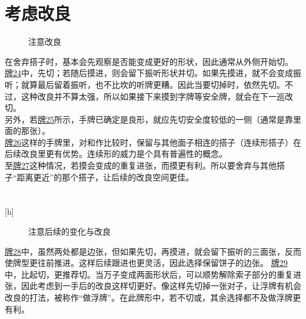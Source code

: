 \section{考虑改良}
\begin{figure}
    \caption{注意改良}
    \label{lec6:pai24-27}
    \par\bigskip
    \par\bigskip
    \par\bigskip
\end{figure}
在舍弃搭子时，基本会先观察是否能变成更好的形状，因此通常从外侧开始切。
\hyperref[lec6:pai24-26]{牌24}中，先切；若随后摸进，则会留下振听形状并切。如果先摸进，就不会变成振听；就算最后留着振听，也不比坎的听牌更糟。因此当要切掉时，依然先切。不过，这种改良并不算太强，所以如果接下来摸到字牌等安全牌，就会在下一巡改切。\\
另外，若\hyperref[lec6:pai24-27]{牌25}所示，手牌已确定是良形，就应先切安全度较低的一侧（通常是靠里面的那张）。\\
\hyperref[lec6:pai24-27]{牌26}这样的手牌里，对和作比较时，保留与其他面子相连的搭子（连续形搭子）在后续改良里更有优势。连续形的威力是个具有普遍性的概念。\\
至\hyperref[lec6:pai24-27]{牌27}这种情况，若摸会变成的重复进张，而摸更有利。所以要舍弃与其他搭子“距离更近”的那个搭子，让后续的改良空间更佳。

\section{}[h]
\begin{figure}
    \caption{注意后续的变化与改良}
    \label{lec6:pai28-29}
    \par\bigskip
\end{figure}
\hyperref[lec6:pai28-29]{牌28}中，虽然两处都是边张，但如果先切，再摸进，就会留下振听的三面张，反而使牌型更往前推进。这样后续跟进也更灵活，因此选择保留饼子的边张。
\hyperref[lec6:pai28-29]{牌29}中，比起切，更推荐切。当万子变成两面形状后，可以顺势解除索子部分的重复进张，因此考虑到一手后的改良这样切更好。像这样先切掉一张对子，让浮牌有机会改良的打法，被称作“做浮牌”。在此牌形中，若不切或，其余选择都不及做浮牌更有利。

